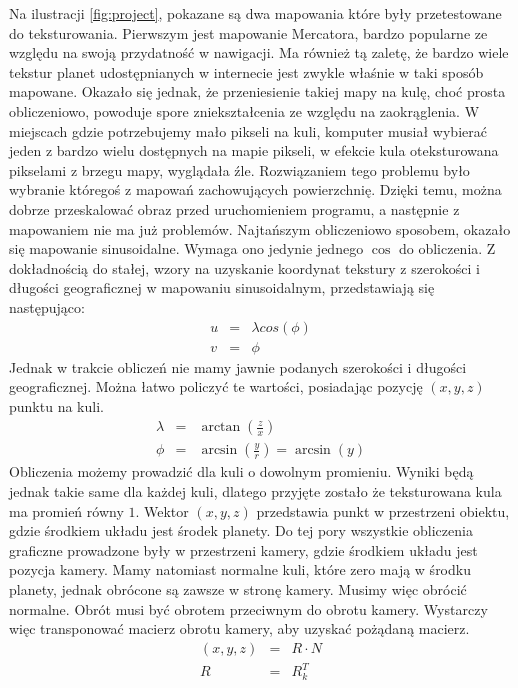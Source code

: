 Na ilustracji \hyperref[fig:project]{\ref{fig:project}}, pokazane są dwa mapowania które były przetestowane do teksturowania. Pierwszym jest mapowanie Mercatora, bardzo popularne ze względu na swoją przydatność w nawigacji. Ma również tą zaletę, że bardzo wiele tekstur planet udostępnianych w internecie jest zwykle właśnie w taki sposób mapowane. Okazało się jednak, że przeniesienie takiej mapy na kulę, choć prosta obliczeniowo, powoduje spore zniekształcenia ze względu na zaokrąglenia. W miejscach gdzie potrzebujemy mało pikseli na kuli, komputer musiał wybierać jeden z bardzo wielu dostępnych na mapie pikseli, w efekcie kula oteksturowana pikselami z brzegu mapy, wyglądała źle. Rozwiązaniem tego problemu było wybranie któregoś z mapowań zachowujących powierzchnię. Dzięki temu, można dobrze przeskalować obraz przed uruchomieniem programu, a następnie z mapowaniem nie ma już problemów. Najtańszym obliczeniowo sposobem, okazało się mapowanie sinusoidalne. Wymaga ono jedynie jednego $\cos$ do obliczenia. Z dokładnością do stałej, wzory na uzyskanie koordynat tekstury z szerokości i długości geograficznej w mapowaniu sinusoidalnym, przedstawiają się następująco:
\begin{eqnarray}
	u &=& \lambda cos(\phi) \\ \nonumber
	v &=& \phi
\end{eqnarray}
Jednak w trakcie obliczeń nie mamy jawnie podanych szerokości i długości geograficznej. Można łatwo policzyć te wartości, posiadając pozycję $(x,y,z)$ punktu na kuli.
\begin{eqnarray}\label{eq:texobj}
	\lambda &=& \arctan(\frac{z}{x}) \\ \nonumber
	\phi &=& \arcsin(\frac{y}{r}) = \arcsin(y) 
\end{eqnarray}
Obliczenia możemy prowadzić dla kuli o dowolnym promieniu. Wyniki będą jednak takie same dla każdej kuli, dlatego przyjęte zostało że teksturowana kula ma promień równy $1$. Wektor $(x,y,z)$ przedstawia punkt w przestrzeni obiektu, gdzie środkiem układu jest środek planety. Do tej pory wszystkie obliczenia graficzne prowadzone były w przestrzeni kamery, gdzie środkiem układu jest pozycja kamery. Mamy natomiast normalne kuli, które zero mają w środku planety, jednak obrócone są zawsze w stronę kamery. Musimy więc obrócić normalne. Obrót musi być obrotem przeciwnym do obrotu kamery. Wystarczy więc transponować macierz obrotu kamery, aby uzyskać pożądaną macierz.
\begin{eqnarray}
(x,y,z) &=& R \cdot N \\ \nonumber
R &=& R_k^T
\end{eqnarray}
